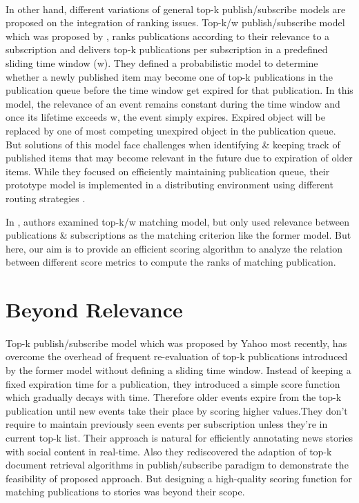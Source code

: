 \documentclass[a4paper,12pt,oneside]{book}
\theoremstyle{definition}
\theoremstyle{remark}
\begin{document}
\paragraph*{}
In other hand, different variations of general top-k publish/subscribe models are proposed on the integration of ranking issues. Top-k/w publish/subscribe model which was proposed by \cite{Pripuzi2008}, ranks publications according to their relevance to a subscription and delivers top-k publications per subscription in a predefined sliding time window (w). They defined a probabilistic model to determine whether a newly published item may become one of top-k publications in the publication queue before the time window get expired for that publication. In this model, the relevance of an event remains constant during the time window and once its lifetime exceeds w, the event simply expires. Expired object will be replaced by one of most competing unexpired object in the publication queue. But solutions of this model face challenges when identifying \& keeping track of published items that may become relevant in the future due to expiration of older items. While they focused on efficiently maintaining publication queue, their prototype model is implemented in a distributing environment using different routing strategies \cite{Pripuzic2012}. 

In \cite{Lu2009}, authors examined top-k/w matching model, but only used relevance between publications \& subscriptions as the matching criterion like the former model. But here, our aim is to provide an efficient scoring algorithm to analyze the relation between different score metrics to compute the ranks of matching publication.

\section{Beyond Relevance}
\paragraph*{}
Top-k publish/subscribe model which was proposed by Yahoo \cite{Shraer2013} most recently, has overcome the overhead of frequent re-evaluation of top-k publications introduced by the former model \cite{Pripuzi2008} without defining a sliding time window. Instead of keeping a fixed expiration time for a publication, they introduced a simple score function which gradually decays with time. Therefore older events expire from the top-k publication
until new events take their place by scoring higher values.They don't require to maintain previously seen events per subscription unless they're in current top-k list. Their approach is natural for efficiently annotating news stories with social content in real-time. Also they rediscovered the adaption of top-k document retrieval algorithms in publish/subscribe paradigm to demonstrate the feasibility of proposed approach. But designing a high-quality scoring function for matching publications to stories was beyond their scope.
\end{document}
